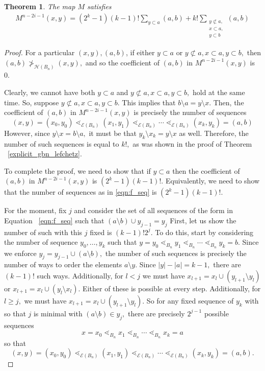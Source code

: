 \documentclass[10 pt]{amsart}
\theoremstyle{plain}
\newtheorem{thm}{Theorem}[section]
\theoremstyle{definition}
\theoremstyle{remark}
\numberwithin{equation}{section}
\begin{document}
\begin{thm}
The map $M$ satisfies 
\begin{align*}
	M^{n-2i-1}(x, y) = (2^k - 1)(k-1)!\sum_{y \subset a}^{}(a, b) +k! \sum_{\substack{{y \not \subset a,}\\{x\subset a,}\\{y \subset b}}}^{}(a, b)
\end{align*}
\end{thm}
\begin{proof}

For a particular $(x, y),(a , b)$, if either $y \subset a$ or $y \not \subset a, x\subset a, y\subset b,$ then $(a, b) \not >_{ \mathcal H(B_n)} (x, y),$ and so the coefficient of $(a, b)$ in $M^{n-2i-1}(x, y)$ is 0.

Clearly, we cannot have both $y \subset a$ and $y \not \subset a, x\subset a, y\subset b,$ hold at the same time. So, suppose  $y \not \subset a, x\subset a, y\subset b.$ This implies that $b\setminus a = y\setminus x.$ Then, the coefficient of $(a, b)$ in $M^{n-2i-1}(x, y)$ is precisely the number of sequences 
\begin{equation}
\label{eqn:f_seq}
(x, y) = (x_0, y_0) \lessdot_{\mathcal E(B_n)} (x_1, y_1) \lessdot_{\mathcal E(B_n)}  \cdots \lessdot_{\mathcal E(B_n)}  (x_k, y_k) = (a, b)
\end{equation}
 However, since $y \setminus x = b\setminus a,$ it must be that $y_k \setminus x_k = y\setminus x$ as well. Therefore, the number of such sequences is equal to $k!,$ as was shown in the proof of Theorem ~\ref{explicit_gbn_lefchetz}.

To complete the proof, we need to show that if $y \subset a$ then the coefficient of $(a, b)$ in $M^{n-2i-1}(x, y)$ is $(2^k - 1)(k-1)!$. Equivalently, we need to show that the number of sequences as in \eqref{eqn:f_seq}
is $(2^k - 1)(k-1)!.$

For the moment, fix $j$ and consider the set of all sequences of the form in Equation ~\eqref{eqn:f_seq} such that $(a\setminus b) \cup y_{j-1} = y_j$ First, let us show the number of such with this $j$ fixed is $(k-1)!2^j.$ To do this, start by considering the number of sequence $y_0,\ldots, y_k$ such that $y=y_0 \lessdot_{B_n} y_1 \lessdot_{B_n} \cdots \lessdot_{B_n} y_k = b.$ Since we enforce $y_j = y_{j-1} \cup (a \setminus b),$ the number of such sequences is precisely the number of ways to order the elements $a \setminus y.$ Since $|y| - |a| = k-1,$ there are $(k-1)!$ such ways. Additionally, for $l <j$ we must have $x_{l+1} = x_l \cup (y_{l+1} \setminus y_l)$ or $x_{l+1} = x_l \cup (y_l \setminus x_l).$ 
Either of these is possible at every step. Additionally, for $l \geq j,$ we must have $x_{l+1} = x_l \cup (y_{l+1} \setminus y_l).$ So for any fixed sequence of $y_k$ with so that $j$ is minimal with $(a\setminus b) \in y_j,$ 
there are precisely $2^{j-1}$ possible sequences 
$$x=x_0 \lessdot_{B_n} x_1 \lessdot_{B_n} \cdots \lessdot_{B_n} x_k = a$$
so that 
$$(x, y) = (x_0, y_0) \lessdot_{\mathcal E(B_n)} (x_1, y_1) \lessdot_{\mathcal E(B_n)}  \cdots \lessdot_{\mathcal E(B_n)}  (x_k, y_k) = (a, b).$$


\end{proof}
\end{document}
